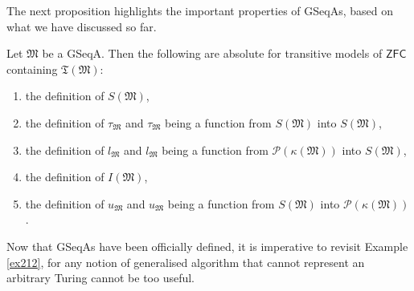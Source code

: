 \documentclass[12pt]{article}
\numberwithin{equation}{section}
\begin{document}
The next proposition highlights the important properties of GSeqAs, based on what we have discussed so far.

\begin{prop}\label{prop226}
Let $\mathfrak{M}$ be a GSeqA. Then the following are absolute for transitive models of $\mathsf{ZFC}$ containing $\mathfrak{T}(\mathfrak{M})$:
\begin{enumerate}[label=(\arabic*)]
    \item the definition of $S(\mathfrak{M})$,
    \item the definition of $\tau_{\mathfrak{M}}$ and $\tau_{\mathfrak{M}}$ being a function from $S(\mathfrak{M})$ into $S(\mathfrak{M})$,
    \item the definition of $l_{\mathfrak{M}}$ and $l_{\mathfrak{M}}$ being a function from $\mathcal{P}(\kappa(\mathfrak{M}))$ into $S(\mathfrak{M})$,
    \item the definition of $I(\mathfrak{M})$,
    \item the definition of $u_{\mathfrak{M}}$ and $u_{\mathfrak{M}}$ being a function from $S(\mathfrak{M})$ into $\mathcal{P}(\kappa(\mathfrak{M}))$. 
\end{enumerate}
\end{prop}

Now that GSeqAs have been officially defined, it is imperative to revisit Example \ref{ex212}, for any notion of generalised algorithm that cannot represent an arbitrary Turing cannot be too useful.
\end{document}
